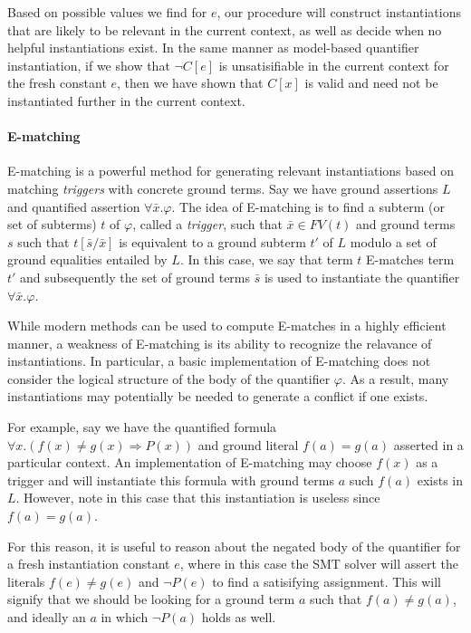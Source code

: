 \documentclass{llncs}
\begin{document}
Based on possible values we find for $e$, our procedure will construct instantiations that are likely to be relevant in the current context, as well as decide when no helpful instantiations exist.
In the same manner as model-based quantifier instantiation, if we show that $\neg C[e]$ is unsatisifiable in the current context for the fresh constant $e$, then we have shown that $C[x]$ is valid and need not be instantiated further in the current context.

\paragraph{E-matching}
E-matching is a powerful method for generating relevant instantiations based on matching \emph{triggers} with concrete ground terms. 
Say we have ground assertions $L$ and quantified assertion $\forall \bar{x}. \varphi$.
The idea of E-matching is to find a subterm (or set of subterms) $t$ of $\varphi$, called a \emph{trigger}, such that $\bar{x} \in FV( t )$ and ground terms $s$ such that $t[\bar{s}/\bar{x}]$ is equivalent to a ground subterm $t'$ of $L$ modulo a set of ground equalities entailed by $L$.
In this case, we say that term $t$ E-matches term $t'$ and subsequently the set of ground terms $\bar{s}$ is used to instantiate the quantifier $\forall \bar{x}. \varphi$.

While modern methods can be used to compute E-matches in a highly efficient manner, a weakness of E-matching is its ability to recognize the relavance of instantiations.
In particular, a basic implementation of E-matching does not consider the logical structure of the body of the quantifier $\varphi$.
As a result, many instantiations may potentially be needed to generate a conflict if one exists.

For example, say we have the quantified formula $\forall x. ( f(x) \neq g(x) \Rightarrow P( x ) )$ and ground literal $f( a ) = g( a )$ asserted in a particular context. 
An implementation of E-matching may choose $f( x )$ as a trigger and will instantiate this formula with ground terms $a$ such $f( a )$ exists in $L$.
However, note in this case that this instantiation is useless since $f( a ) = g( a )$.

For this reason, it is useful to reason about the negated body of the quantifier for a fresh instantiation constant $e$, where in this case the SMT solver will assert the literals $f( e ) \neq g( e )$ and $\neg P( e )$ to find a satisifying assignment.
This will signify that we should be looking for a ground term $a$ such that $f( a ) \neq g( a )$, and ideally an $a$ in which $\neg P( a )$ holds as well.
\end{document}
